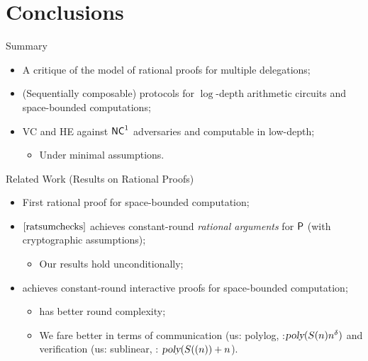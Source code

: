 \section{Conclusions}

\begin{frame}{Summary}
		\begin{itemize}[<+- | alert@+>]	
			\item A critique of the model of rational proofs for multiple delegations;
			\item (Sequentially composable) protocols for $\log$-depth arithmetic circuits and space-bounded computations;
			\item VC and HE against $\NC^1$ adversaries and computable in low-depth;
			\begin{itemize}
				\item Under minimal assumptions.
			\end{itemize}
		\end{itemize}
\end{frame}

\begin{frame}{Related Work (Results on Rational Proofs)}
\begin{itemize}[<+- | alert@+>]
	\item First rational proof for space-bounded computation;
	\item $\cite{ratsumchecks}$ achieves constant-round \textit{rational arguments} for $\P$ (with cryptographic assumptions);
	\begin{itemize}
		\item Our results hold unconditionally;
	\end{itemize}
	\item \cite{rrr16} achieves constant-round interactive proofs for space-bounded computation;
	\begin{itemize}
		\item \cite{rrr16} has better round complexity;
		\item We fare better in terms of communication (us: polylog, \cite{rrr16}:$\poly(S(n)n^{\delta})$ and verification (us: sublinear, \cite{rrr16}: $\poly(S((n)) + n$).
	\end{itemize}
\end{itemize}
\end{frame}


